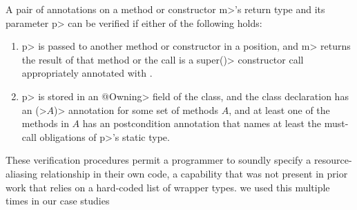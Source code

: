 A pair of \MustCallAlias annotations on a method or constructor \<m>'s return type
and its parameter \<p> can be verified if either of the following holds:
\begin{enumerate}
\item \<p> is passed to another method or constructor in a
  \MustCallAlias position, and \<m> returns the result of that method
  or the call is a \<super()> constructor call appropriately annotated
  with \MustCallAlias.
\item \<p> is stored in an \<@Owning> field of the class, and the
  class declaration has an \MustCall\<(>$A$\<)> annotation for some set
  of methods $A$, and at least one of the methods in $A$ has an
  \EnsuresCalledMethods postcondition annotation that names at least the
  must-call obligations of \<p>'s static type.
\end{enumerate}
These verification procedures permit a programmer to soundly specify a resource-aliasing
relationship in their own code, a capability that was not present in prior work
that relies on a hard-coded list of wrapper types.  we used this
multiple times
in our case studies



